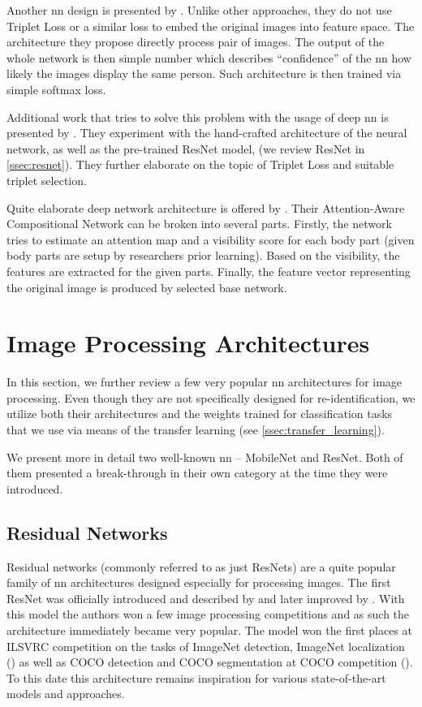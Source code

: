 Another \gls{nn} design is presented by \cite{li2014deepreid}. Unlike other approaches, they do not use Triplet Loss or a similar loss to embed the original images into feature space. The architecture they propose directly process pair of images. The output of the whole network is then simple number which describes ``confidence'' of the \gls{nn} how likely the images display the same person. Such architecture is then trained via simple softmax loss.

Additional work that tries to solve this problem with the usage of deep \gls{nn} is presented by \cite{hermans2017defense}. They experiment with the hand-crafted architecture of the neural network, as well as the pre-trained ResNet model, (we review ResNet in \autoref{ssec:resnet}). They further elaborate on the topic of Triplet Loss and suitable triplet selection.

Quite elaborate deep network architecture is offered by \cite{xu2018attention}. Their Attention-Aware Compositional Network can be broken into several parts. Firstly, the network tries to estimate an attention map and a visibility score for each body part (given body parts are setup by researchers prior learning). Based on the visibility, the features are extracted for the given parts. Finally, the feature vector representing the original image is produced by selected base network.

\section{Image Processing Architectures}

\label{sec:existing_architectures}

In this section, we further review a few very popular \gls{nn} architectures for image processing. Even though they are not specifically designed for re-identification, we utilize both their architectures and the weights trained for classification tasks that we use via means of the transfer learning (see \autoref{ssec:transfer_learning}).

We present more in detail two well-known \gls{nn} -- MobileNet and ResNet. Both of them presented a break-through in their own category at the time they were introduced.

\subsection{Residual Networks}
\label{ssec:resnet}


Residual networks (commonly referred to as just ResNets) are a quite popular family of \gls{nn} architectures designed especially for processing images. The first ResNet was officially introduced and described by \cite{resnet} and later improved by \cite{resnetimp}. With this model the authors won a few image processing competitions and as such the architecture immediately became very popular. The model won the first places at ILSVRC competition on the tasks of ImageNet detection, ImageNet localization (\cite{imagenetresults}) as well as COCO detection and COCO segmentation at COCO competition (\cite{cocodataset}). To this date this architecture remains inspiration for various state-of-the-art models and approaches.

